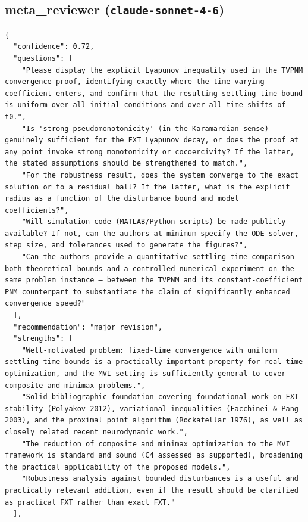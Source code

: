 \documentclass[11pt]{article}
\begin{document}
\subsection*{meta_reviewer (\texttt{claude-sonnet-4-6})}
\begin{verbatim}
{
  "confidence": 0.72,
  "questions": [
    "Please display the explicit Lyapunov inequality used in the TVPNM convergence proof, identifying exactly where the time-varying coefficient enters, and confirm that the resulting settling-time bound is uniform over all initial conditions and over all time-shifts of t0.",
    "Is 'strong pseudomonotonicity' (in the Karamardian sense) genuinely sufficient for the FXT Lyapunov decay, or does the proof at any point invoke strong monotonicity or cocoercivity? If the latter, the stated assumptions should be strengthened to match.",
    "For the robustness result, does the system converge to the exact solution or to a residual ball? If the latter, what is the explicit radius as a function of the disturbance bound and model coefficients?",
    "Will simulation code (MATLAB/Python scripts) be made publicly available? If not, can the authors at minimum specify the ODE solver, step size, and tolerances used to generate the figures?",
    "Can the authors provide a quantitative settling-time comparison — both theoretical bounds and a controlled numerical experiment on the same problem instance — between the TVPNM and its constant-coefficient PNM counterpart to substantiate the claim of significantly enhanced convergence speed?"
  ],
  "recommendation": "major_revision",
  "strengths": [
    "Well-motivated problem: fixed-time convergence with uniform settling-time bounds is a practically important property for real-time optimization, and the MVI setting is sufficiently general to cover composite and minimax problems.",
    "Solid bibliographic foundation covering foundational work on FXT stability (Polyakov 2012), variational inequalities (Facchinei & Pang 2003), and the proximal point algorithm (Rockafellar 1976), as well as closely related recent neurodynamic work.",
    "The reduction of composite and minimax optimization to the MVI framework is standard and sound (C4 assessed as supported), broadening the practical applicability of the proposed models.",
    "Robustness analysis against bounded disturbances is a useful and practically relevant addition, even if the result should be clarified as practical FXT rather than exact FXT."
  ],

\end{verbatim}
\end{document}
